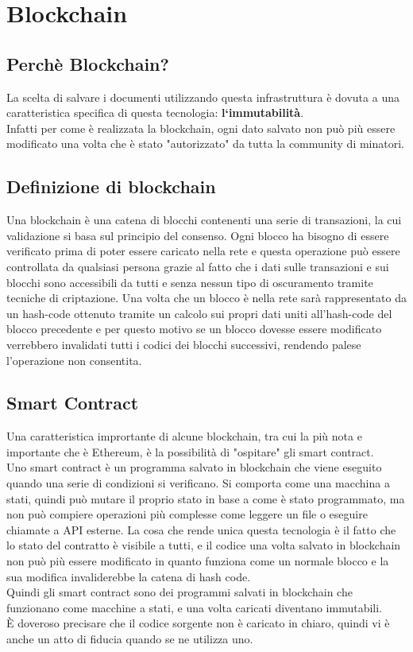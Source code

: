 \section{Blockchain}
    \subsection{Perchè Blockchain?}
    La scelta di salvare i documenti utilizzando questa infrastruttura è dovuta a una caratteristica specifica di questa tecnologia: \textbf{l`immutabilità}.\\
    Infatti per come è realizzata la blockchain, ogni dato salvato non può più essere modificato una volta che è stato "autorizzato" da tutta la community di minatori.
    
    \subsection{Definizione di blockchain}
    Una blockchain è una catena di blocchi contenenti una serie di transazioni, la cui validazione si basa sul principio del consenso. Ogni blocco ha bisogno di essere verificato prima di poter essere caricato nella rete e questa operazione può essere controllata da qualsiasi persona grazie al fatto che i dati sulle transazioni e sui blocchi sono accessibili da tutti e senza nessun tipo di oscuramento tramite tecniche di criptazione. Una volta che un blocco è nella rete sarà rappresentato da un hash-code ottenuto tramite un calcolo sui propri dati uniti all'hash-code del blocco precedente e per questo motivo se un blocco dovesse essere modificato verrebbero invalidati tutti i codici dei blocchi successivi, rendendo palese l'operazione non consentita.
    
    \subsection{Smart Contract}
    Una caratteristica imprortante di alcune blockchain, tra cui la più nota e importante che è Ethereum, è la possibilità di "ospitare" gli smart contract.\\
    Uno smart contract è un programma salvato in blockchain che viene eseguito quando una serie di condizioni si verificano. Si comporta come una macchina a stati, quindi può mutare il proprio stato in base a come è stato programmato, ma non può compiere operazioni più complesse come leggere un file o eseguire chiamate a API esterne. La cosa che rende unica questa tecnologia è il fatto che lo stato del contratto è visibile a tutti, e il codice una volta salvato in blockchain non può più essere modificato in quanto funziona come un normale blocco e la sua modifica invaliderebbe la catena di hash code.\\
    Quindi gli smart contract sono dei programmi salvati in blockchain che funzionano come macchine a stati, e una volta caricati diventano immutabili.\\
    È doveroso precisare che il codice sorgente non è caricato in chiaro, quindi vi è anche un atto di fiducia quando se ne utilizza uno.
    